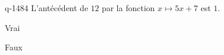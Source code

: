 \begin{truefalse}{q-1484}
L'antécédent de $12$ par la fonction $x\mapsto 5x+7$ est $1$.
\item* Vrai
\item Faux
\end{truefalse}

